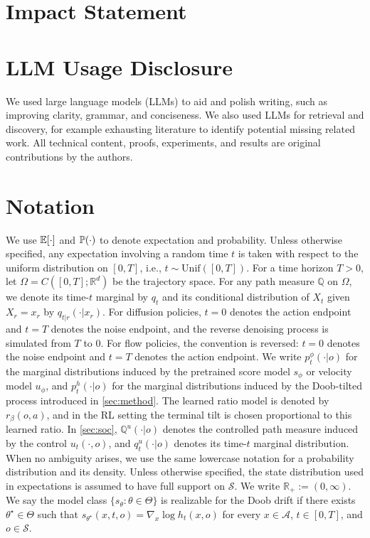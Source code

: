 {
\setlength{\parskip}{-0em}
\startcontents[sections]
}
\clearpage

\section*{Impact Statement}

\section*{LLM Usage Disclosure}
We used large language models (LLMs) to aid and polish writing, such as improving clarity, grammar, and conciseness. We also used LLMs for retrieval and discovery, for example exhausting literature to identify potential missing related work. All technical content, proofs, experiments, and results are original contributions by the authors.


\section{Notation}
\label{sec:notation}
We use $\E[\cdot]$ and $\P(\cdot)$ to denote expectation and probability.
Unless otherwise specified, any expectation involving a random time $t$ is taken with respect to the uniform distribution on $[0,T]$, i.e., $t\sim \mathrm{Unif}([0,T])$.
For a time horizon $T>0$, let $\Omega=C([0,T];\mathbb R^d)$ be the trajectory space.
For any path measure $\mathbb Q$ on $\Omega$, we denote its time-$t$ marginal by $q_t$ and its conditional distribution of $X_t$ given $X_r=x_r$ by $q_{t|r}(\cdot|x_r)$.
For diffusion policies, $t=0$ denotes the action endpoint and $t=T$ denotes the noise endpoint, and the reverse denoising process is simulated from $T$ to $0$.
For flow policies, the convention is reversed: $t=0$ denotes the noise endpoint and $t=T$ denotes the action endpoint.
We write $p_t^\phi(\cdot|o)$ for the marginal distributions induced by the pretrained score model $s_\phi$ or velocity model $u_\phi$, and $p_t^h(\cdot|o)$ for the marginal distributions induced by the Doob-tilted process introduced in \cref{sec:method}.
The learned ratio model is denoted by $r_\beta(o,a)$, and in the RL setting the terminal tilt is chosen proportional to this learned ratio.
In \cref{sec:soc}, $\mathbb Q^u(\cdot|o)$ denotes the controlled path measure induced by the control $u_t(\cdot,o)$, and $q_t^u(\cdot|o)$ denotes its time-$t$ marginal distribution.
When no ambiguity arises, we use the same lowercase notation for a probability distribution and its density.
Unless otherwise specified, the state distribution used in expectations is assumed to have full support on $\mathcal S$.
We write $\mathbb R_+ := (0,\infty)$.
We say the model class $\{s_\theta:\theta\in\Theta\}$ is realizable for the Doob drift if there exists $\theta^\star\in\Theta$ such that
$s_{\theta^\star}(x,t,o)=\nabla_x\log h_t(x,o)$
for every $x\in\mathcal A$, $t\in[0,T]$, and $o \in\mathcal S$.


